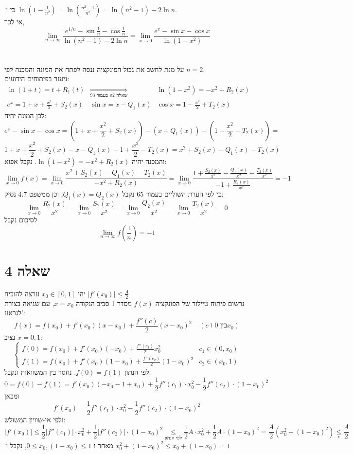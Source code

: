 \documentclass{article}
\newcommand\underrel[2]{\mathrel{\mathop{#2}\limits_{#1}}}
\begin{document}
* כי $\ln(1-\frac{1}{n^2}) = \ln(\frac{n^2-1}{n^2})=\ln(n^2-1)-2\ln n$. \\
אי לכך,
\[
    \lim_{n\rightarrow\infty} \frac{e^{1/n} -\sin \frac{1}{n} -\cos \frac{1}{n}}{\ln(n^2-1)-2\ln n} =
    \lim_{x\rightarrow 0} \frac{e^x -\sin x-\cos x}{\ln(1-x^2)}
\]
\\\\
על מנת לחשב את גבול הפונקציה ננסה לפתח את המונה והמכנה לפי $n=2$. \\
ניעזר בפיתוחים הידועים:
\[
    \begin{matrix}
        \ln(1+t) = t + R_1(t)               & \underrel{\text{שאלה 2א בעמוד 93}}{\Rightarrow} & \ln(1-x^2)=-x^2+R_2(x) \\
        e^x = 1 + x + \frac{x^2}{2}+ S_2(x) &
        \sin x = x - Q_1(x)                 &
        \cos x = 1 - \frac{x^2}{2} + T_2(x)
    \end{matrix}
\]
לכן המונה יהיה:
\[
    e^x-\sin x - \cos x =
    (1 + x + \frac{x^2}{2}+ S_2(x)) - (x + Q_1(x)) - (1 - \frac{x^2}{2} + T_2(x)) =
\]
\[
    1+x+\frac{x^2}{2}+ S_2(x) - x - Q_1(x) - 1 + \frac{x^2}{2} - T_2(x)=
    x^2+S_2(x)-Q_1(x)-T_2(x)
\]
והמכנה יהיה $\ln(1-x^2)=-x^2+R_2(x)$. נקבל אפוא:
\[
    \lim_{x\rightarrow 0} f(x) =
    \lim_{x\rightarrow 0} \frac{x^2+S_2(x)-Q_1(x)-T_2(x)}{-x^2+R_2(x)} =
    \lim_{x\rightarrow 0} \frac{1+\frac{S_2(x)}{x^2}-\frac{Q_1(x)}{x^2}-\frac{T_2(x)}{x^2}}{-1+\frac{R_2(x)}{x^2}} = -1
\]
כי לפי הערת השוליים בעמוד 65 נקבל $Q_1(x)=Q_2(x)$, וכן ממשפט 4.7 נסיק:
\[
    \lim_{x\rightarrow 0} \frac{R_2(x)}{x^2} =
    \lim_{x\rightarrow 0} \frac{S_2(x)}{x^2} =
    \lim_{x\rightarrow 0} \frac{Q_2(x)}{x^2} =
    \lim_{x\rightarrow 0} \frac{T_2(x)}{x^2} = 0
\]
לסיכום נקבל
\[
    \lim_{n\rightarrow \infty} f(\frac{1}{n}) = -1
\]

\pagebreak

\section*{שאלה 4}

יהי $x_0\in [0,1]$ ונרצה להוכיח $|f'(x_0)|\leq \frac{A}{2}$ \\
נרשום פיתוח טיילור של הפונקציה $f(x)$ מסדר 1 סביב הנקודה $x=x_0$,
עם שגיאה בצורת לגראנז':
\[
    f(x)=f(x_0)+f'(x_0)(x-x_0)+\frac{f''(c)}{2}(x-x_0)^2 \;\;\;\; (\text{$c$ בין 0 ו$x_0$})
\]
נציב $x=0,1$:
\[
    \begin{cases}
        f(0)=f(x_0)+f'(x_0)(-x_0)+\frac{f''(c_1)}{2}x_0^2      & c_1\in (0,x_0) \\
        f(1)=f(x_0)+f'(x_0)(1-x_0)+\frac{f''(c_2)}{2}(1-x_0)^2 & c_2\in(x_0,1)
    \end{cases}
\]
לפי הנתון $f(0)=f(1)$. נחסר בין המשוואות ונקבל:
\[
    0=f(0)-f(1)=
    f'(x_0)(-x_0-1+x_0)+\frac{1}{2}f''(c_1)\cdot x_0^2 - \frac{1}{2}f''(c_2)\cdot (1-x_0)^2
\]
ומכאן
\[
    f'(x_0)=\frac{1}{2}f''(c_1)\cdot x_0^2 - \frac{1}{2}f''(c_2)\cdot (1-x_0)^2
\]
ולפי אי-שוויון המשולש:
\[
    |f'(x_0)|\leq
    \frac{1}{2} |f''(c_1)| \cdot x_0^2 + \frac{1}{2}|f''(c_2)|\cdot (1-x_0)^2 \underrel{\text{לפי הנתון}}{\leq}
    \frac{1}{2} A \cdot x_0^2 + \frac{1}{2}A\cdot (1-x_0)^2=
    \frac{A}{2} (x_0^2 + (1-x_0)^2)\underrel{\ast}{\leq} \frac{A}{2}
\]
* מאחר ו $0\leq x_0, (1-x_0) \leq 1$, נקבל $x_0^2+(1-x_0)^2\leq x_0+(1-x_0)=1$
\end{document}
